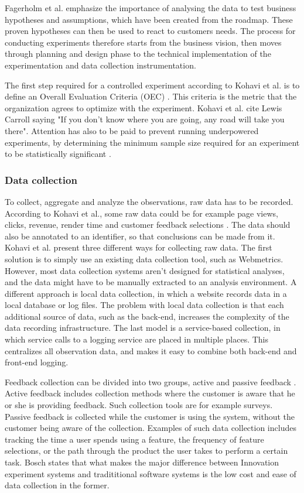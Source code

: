 \documentclass[english, grading]{tktltiki2}
\theoremstyle{definition}
\theoremstyle{remark}
\begin{document}
Fagerholm et al. emphasize the importance of analysing the data to test business hypotheses and assumptions, which have been created from the roadmap. These proven hypotheses can then be used to react to customers needs. The process for conducting experiments therefore starts from the business vision, then moves through planning and design phase to the technical implementation of the experimentation and data collection instrumentation.  

The first step required for a controlled experiment according to Kohavi et al. is to define an Overall Evaluation Criteria (OEC) \cite{kohavi2009online}. This criteria is the metric that the organization agrees to optimize with the experiment. Kohavi et al. cite Lewis Carroll saying "If you don’t know where you are going, any road will take you there". Attention has also to be paid to prevent running underpowered experiments, by determining the minimum sample size required for an experiment to be statistically significant \cite{kohavi2009controlled}.

\subsubsection{Data collection} 
To collect, aggregate and analyze the observations, raw data has to be recorded. According to Kohavi et al., some raw data could be for example page views, clicks, revenue, render time and customer feedback selections \cite{kohavi2007practical}. The data should also be annotated to an identifier, so that conclusions can be made from it. Kohavi et al. present three different ways for collecting raw data. The first solution is to simply use an existing data collection tool, such as Webmetrics. However, most data collection systems aren't designed for statistical analyses, and the data might have to be manually extracted to an analysis environment. A different approach is local data collection, in which a website records data in a local database or log files. The problem with local data collection is that each additional source of data, such as the back-end, increases the complexity of the data recording infrastructure. The last model is a service-based collection, in which service calls to a logging service are placed in multiple places. This centralizes all observation data, and makes it easy to combine both back-end and front-end logging.

Feedback collection can be divided into two groups, active and passive feedback \cite{bosch2012building}. Active feedback includes collection methods where the customer is aware that he or she is providing feedback. Such collection tools are for example surveys. Passive feedback is collected while the customer is using the system, without the customer being aware of the collection. Examples of such data collection includes tracking the time a user spends using a feature, the frequency of feature selections, or the path through the product the user takes to perform a certain task. Bosch states that what makes the major difference between Innovation experiment systems and tradititional software systems is the low cost and ease of data collection in the former. 
\end{document}
